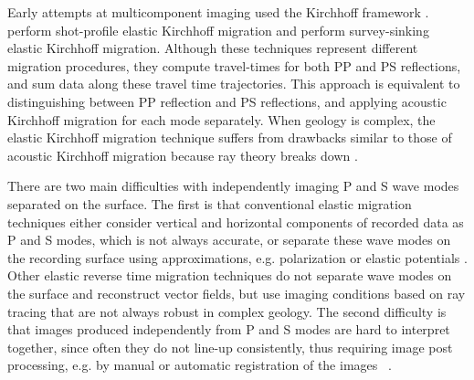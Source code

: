 Early attempts at multicomponent imaging used the Kirchhoff framework
 \cite[]{WapenaarEtAl1987,WapenaarHaime1990}.
\cite{GEO49-08-12231238} perform shot-profile elastic Kirchhoff
migration\geouline{,} and \cite{hokstad:861} perform survey-sinking
elastic Kirchhoff migration. Although these techniques represent
different migration procedures, they compute travel-times for both PP
and PS reflections, and sum data along these travel time
trajectories. This approach is equivalent to distinguishing between PP
reflection and PS reflections, and applying acoustic Kirchhoff
migration for each mode separately. When geology is complex, the
elastic Kirchhoff migration technique suffers from drawbacks similar
to those of acoustic Kirchhoff migration because ray theory breaks
down \cite[]{GEO66-05-16221640}.

There are two main difficulties with independently imaging P and S
wave modes separated on the surface.  The first is that conventional
elastic migration techniques either consider vertical and horizontal
components of recorded data as P and S modes, which is not always
accurate, or separate these wave modes on the recording surface using
approximations, e.g.  polarization \cite[]{pestana:1308} or elastic
potentials \cite[]{etgen:972,GEO62-02-05980613} 
\cite[]{WapenaarEtAl1990,AmundsenReitan1995}. Other elastic reverse
time migration techniques do not separate wave modes on the surface
and reconstruct vector fields, but use imaging conditions based on ray
tracing \cite[]{chang:67,chang:597} that are not always robust in
complex geology. The second difficulty is that images produced
independently from P and S modes are hard to interpret together, since
often they do not line-up consistently, thus requiring image post
processing, e.g. by manual or automatic registration of the images
~\cite[]{Gaiser1996,fomel:781,nickel:869}.

